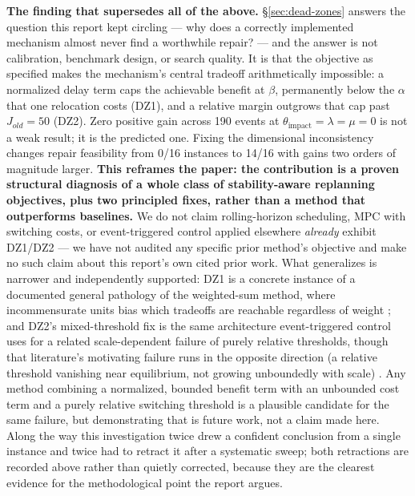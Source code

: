 \documentclass[11pt]{article}
\begin{document}
\textbf{The finding that supersedes all of the above.}
\S\ref{sec:dead-zones} answers the question this report kept circling ---
why does a correctly implemented mechanism almost never find a worthwhile
repair? --- and the answer is not calibration, benchmark design, or search
quality. It is that the objective as specified makes the mechanism's
central tradeoff arithmetically impossible: a normalized delay term caps
the achievable benefit at $\beta$, permanently below the $\alpha$ that one
relocation costs (DZ1), and a relative margin outgrows that cap past
$J_{old}=50$ (DZ2). Zero positive gain across 190 events at
$\theta_{\text{impact}}=\lambda=\mu=0$ is not a weak result; it is the
predicted one. Fixing the dimensional inconsistency changes repair
feasibility from 0/16 instances to 14/16 with gains two orders of magnitude
larger. \textbf{This reframes the paper: the contribution is a proven
structural diagnosis of a whole class of stability-aware replanning
objectives, plus two principled fixes, rather than a method that
outperforms baselines.} We do not claim rolling-horizon scheduling, MPC
with switching costs, or event-triggered control applied elsewhere
\emph{already} exhibit DZ1/DZ2 --- we have not audited any specific prior
method's objective and make no such claim about this report's own cited
prior work. What generalizes is narrower and independently supported: DZ1
is a concrete instance of a documented general pathology of the
weighted-sum method, where incommensurate units bias which tradeoffs are
reachable regardless of weight \cite{marler2010}; and DZ2's mixed-threshold
fix is the same architecture event-triggered control uses for a related
scale-dependent failure of purely relative thresholds, though that
literature's motivating failure runs in the opposite direction (a relative
threshold vanishing near equilibrium, not growing unboundedly with scale)
\cite{yaqoob2022}. Any method combining a normalized, bounded benefit term
with an unbounded cost term and a purely relative switching threshold is a
plausible candidate for the same failure, but demonstrating that is future
work, not a claim made here. Along the way this investigation twice drew a
confident conclusion from a single instance and twice had to retract it
after a systematic sweep; both retractions are recorded above rather than
quietly corrected, because they are the clearest evidence for the
methodological point the report argues.
\end{document}

